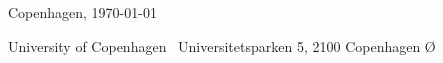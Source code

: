 \begin{titlepage}
\vspace{12mm}

\begin{center}
  Copenhagen, \today
\end{center}

\vspace{8mm}

\noindent
\colorbox{KURed}{%
  \parbox{\dimexpr\textwidth+2\fboxsep\relax}{%
    \vspace{3mm}
    \centering
    {\color{white}\small
      University of Copenhagen \textbullet\
      Universitetsparken 5, 2100 Copenhagen Ø
    }
    \vspace{3mm}
  }%
}

\restoregeometry
\end{titlepage}
